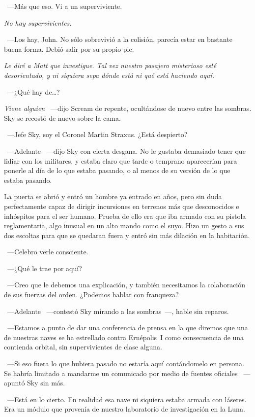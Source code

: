 ~---Más que eso. Vi a un superviviente.

\emph{No hay supervivientes.}

~---Los hay, John. No sólo sobrevivió a la colisión, parecía estar en bastante buena forma. Debió salir por su propio pie.

\emph{Le diré a Matt que investigue. Tal vez nuestro pasajero misterioso esté desorientado, y ni siquiera sepa dónde está ni qué está haciendo aquí.}

~---¿Qué hay de\dots?

\emph{Viene alguien} ~---dijo Scream de repente, ocultándose de nuevo entre las sombras. Sky se recostó de nuevo sobre la cama.

~---Jefe Sky, soy el Coronel Martin Straxus. ¿Está despierto?

~---Adelante ~---dijo Sky con cierta desgana. No le gustaba demasiado tener que lidiar con los militares, y estaba claro que tarde o temprano aparecerían para ponerle al día de lo que estaba pasando, o al menos de su versión de lo que estaba pasando.

La puerta se abrió y entró un hombre ya entrado en años, pero sin duda perfectamente capaz de dirigir incursiones en terrenos más que desconocidos e inhóspitos para el ser humano. Prueba de ello era que iba armado con su pistola reglamentaria, algo inusual en un alto mando como el suyo. Hizo un gesto a sus dos escoltas para que se quedaran fuera y entró sin más dilación en la habitación.

~---Celebro verle consciente.

~---¿Qué le trae por aquí?

~---Creo que le debemos una explicación, y también necesitamos la colaboración de sus fuerzas del orden. ¿Podemos hablar con franqueza?

~---Adelante ~---contestó Sky mirando a las sombras~---, hable sin reparos.

~---Estamos a punto de dar una conferencia de prensa en la que diremos que una de nuestras naves se ha estrellado contra Ernépolis~I como consecuencia de una contienda orbital, sin supervivientes de clase alguna.

~---Si eso fuera lo que hubiera pasado no estaría aquí contándomelo en persona. Se habría limitado a mandarme un comunicado por medio de fuentes oficiales ~---apuntó Sky sin más.

~---Está en lo cierto. En realidad esa nave ni siquiera estaba armada con láseres. Era un módulo que provenía de nuestro laboratorio de investigación en la Luna.

